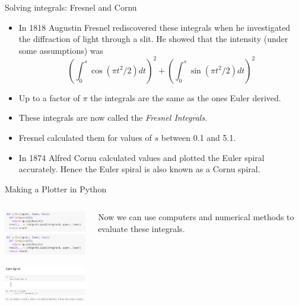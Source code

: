 \documentclass{beamer}
\begin{document}
\begin{frame}{Solving integrals: Fresnel and Cornu}
	\begin{itemize}
		\item In 1818 Augustin Fresnel rediscovered these integrals when he investigated the diffraction of light through a slit. He showed that the intensity (under some assumptions) was 
		\[
		\left( \int_{0}^{s}\cos \left( \pi t^2 / 2 \right) dt \right) ^2 + 
		\left( \int_{0}^{s}\sin \left( \pi t^2 / 2 \right) dt \right) ^2
		\] 
		\item Up to a factor of $\pi$ the integrals are the same as the ones Euler derived.
		\item These integrals are now called the \emph{Fresnel Integrals}.
		\item Fresnel calculated them for values of $s$ between 0.1 and 5.1.
		\item In 1874 Alfred Cornu calculated values and plotted the Euler spiral accurately. Hence the Euler spiral is also known as a Cornu spiral.
	\end{itemize}
\end{frame}


\begin{frame}{Making a Plotter in Python}
	\begin{columns}
		\begin{column}{0.5\textwidth}
			\includegraphics[width=50mm, scale=0.5]{code_1.png}
			
			\includegraphics[width=50mm, scale=0.5]{code_2.png}
		\end{column}
		\begin{column}{0.5\textwidth}
		Now we can use computers and numerical methods to evaluate these integrals.
			
		\end{column}
	\end{columns}
\end{frame}
\end{document}
